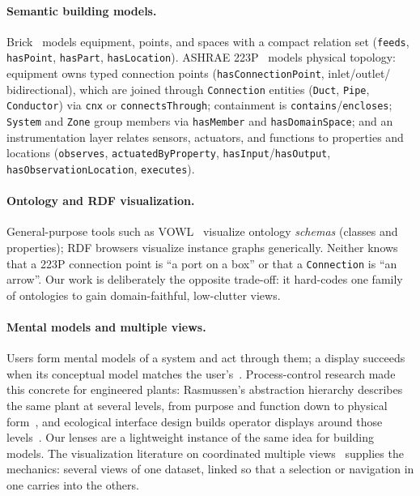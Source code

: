 \documentclass[10pt,twocolumn]{article}
\newcommand{\pred}[1]{\texttt{#1}}   %
\begin{document}
\paragraph{Semantic building models.}
Brick~\cite{balaji2016brick} models equipment, points, and spaces with a compact
relation set (\pred{feeds}, \pred{hasPoint}, \pred{hasPart},
\pred{hasLocation}). ASHRAE 223P~\cite{ashrae223p} models physical topology:
equipment owns typed connection points (\pred{hasConnectionPoint}, inlet/outlet/
bidirectional), which are joined through \pred{Connection} entities
(\pred{Duct}, \pred{Pipe}, \pred{Conductor}) via \pred{cnx} or
\pred{connectsThrough}; containment is \pred{contains}/\pred{encloses};
\pred{System} and \pred{Zone} group members via \pred{hasMember} and
\pred{hasDomainSpace}; and an instrumentation layer relates sensors, actuators,
and functions to properties and locations (\pred{observes},
\pred{actuatedByProperty}, \pred{hasInput}/\pred{hasOutput},
\pred{hasObservationLocation}, \pred{executes}).

\paragraph{Ontology and RDF visualization.}
General-purpose tools such as VOWL~\cite{lohmann2016vowl} visualize ontology
\emph{schemas} (classes and properties); RDF browsers visualize instance graphs
generically. Neither knows that a 223P connection point is ``a port on a box'' or
that a \pred{Connection} is ``an arrow''. Our work is deliberately the opposite
trade-off: it hard-codes one family of ontologies to gain domain-faithful,
low-clutter views.

\paragraph{Mental models and multiple views.}
Users form mental models of a system and act through them; a display succeeds
when its conceptual model matches the user's~\cite{johnsonlaird1983mental,norman2013design}.
Process-control research made this concrete for engineered plants:
Rasmussen's abstraction hierarchy describes the same plant at several levels, from
purpose and function down to physical form~\cite{rasmussen1985role}, and
ecological interface design builds operator displays around those
levels~\cite{vicente1992ecological}. Our lenses are a lightweight instance of the
same idea for building models. The visualization literature on coordinated
multiple views~\cite{wangbaldonado2000guidelines,roberts2007state} supplies the
mechanics: several views of one dataset, linked so that a selection or
navigation in one carries into the others.
\end{document}
